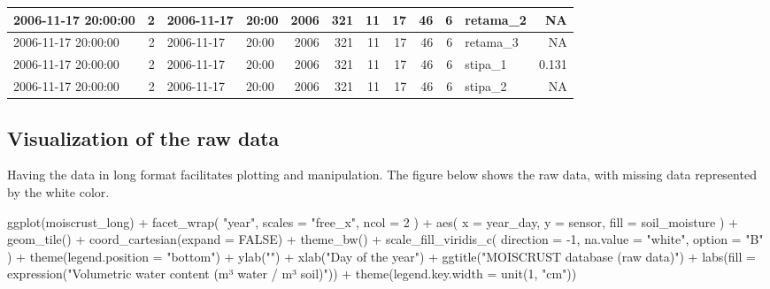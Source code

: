 \documentclass[
  table]{article}
\newenvironment{Shaded}{\begin{snugshade}}{\end{snugshade}}
\newcommand{\AttributeTok}[1]{\textcolor[rgb]{0.77,0.63,0.00}{#1}}
\newcommand{\ConstantTok}[1]{\textcolor[rgb]{0.00,0.00,0.00}{#1}}
\newcommand{\DecValTok}[1]{\textcolor[rgb]{0.00,0.00,0.81}{#1}}
\newcommand{\FunctionTok}[1]{\textcolor[rgb]{0.00,0.00,0.00}{#1}}
\newcommand{\NormalTok}[1]{#1}
\newcommand{\SpecialCharTok}[1]{\textcolor[rgb]{0.00,0.00,0.00}{#1}}
\newcommand{\StringTok}[1]{\textcolor[rgb]{0.31,0.60,0.02}{#1}}
\begin{document}
\begin{table}[H]
{\begin{tabular}[t]{l|r|l|l|r|r|r|r|r|r|l|r}
\hline
2006-11-17 20:00:00 & 2 & 2006-11-17 & 20:00 & 2006 & 321 & 11 & 17 & 46 & 6 & retama\_2 & NA\\
\hline
2006-11-17 20:00:00 & 2 & 2006-11-17 & 20:00 & 2006 & 321 & 11 & 17 & 46 & 6 & retama\_3 & NA\\
\hline
2006-11-17 20:00:00 & 2 & 2006-11-17 & 20:00 & 2006 & 321 & 11 & 17 & 46 & 6 & stipa\_1 & 0.131\\
\hline
2006-11-17 20:00:00 & 2 & 2006-11-17 & 20:00 & 2006 & 321 & 11 & 17 & 46 & 6 & stipa\_2 & NA\\
\hline
\end{tabular}}
\end{table}

\hypertarget{visualization-of-the-raw-data}{%
\subsection{Visualization of the raw
data}\label{visualization-of-the-raw-data}}

Having the data in long format facilitates plotting and manipulation.
The figure below shows the raw data, with missing data represented by
the white color.

\begin{Shaded}
\begin{Highlighting}[]
\FunctionTok{ggplot}\NormalTok{(moiscrust\_long) }\SpecialCharTok{+} 
  \FunctionTok{facet\_wrap}\NormalTok{(}
    \StringTok{"year"}\NormalTok{, }
    \AttributeTok{scales =} \StringTok{"free\_x"}\NormalTok{, }
    \AttributeTok{ncol =} \DecValTok{2}
\NormalTok{    ) }\SpecialCharTok{+}
  \FunctionTok{aes}\NormalTok{(}
    \AttributeTok{x =}\NormalTok{ year\_day, }
    \AttributeTok{y =}\NormalTok{ sensor, }
    \AttributeTok{fill =}\NormalTok{ soil\_moisture}
\NormalTok{    ) }\SpecialCharTok{+} 
  \FunctionTok{geom\_tile}\NormalTok{() }\SpecialCharTok{+} 
  \FunctionTok{coord\_cartesian}\NormalTok{(}\AttributeTok{expand =} \ConstantTok{FALSE}\NormalTok{) }\SpecialCharTok{+}
  \FunctionTok{theme\_bw}\NormalTok{() }\SpecialCharTok{+} 
  \FunctionTok{scale\_fill\_viridis\_c}\NormalTok{(}
    \AttributeTok{direction =} \SpecialCharTok{{-}}\DecValTok{1}\NormalTok{, }
    \AttributeTok{na.value =} \StringTok{"white"}\NormalTok{, }
    \AttributeTok{option =} \StringTok{"B"}
\NormalTok{    ) }\SpecialCharTok{+} 
  \FunctionTok{theme}\NormalTok{(}\AttributeTok{legend.position =} \StringTok{"bottom"}\NormalTok{) }\SpecialCharTok{+} 
  \FunctionTok{ylab}\NormalTok{(}\StringTok{""}\NormalTok{) }\SpecialCharTok{+} 
  \FunctionTok{xlab}\NormalTok{(}\StringTok{"Day of the year"}\NormalTok{) }\SpecialCharTok{+}
  \FunctionTok{ggtitle}\NormalTok{(}\StringTok{"MOISCRUST database (raw data)"}\NormalTok{) }\SpecialCharTok{+}
  \FunctionTok{labs}\NormalTok{(}\AttributeTok{fill =} \FunctionTok{expression}\NormalTok{(}\StringTok{"Volumetric water content (m³ water / m³ soil)"}\NormalTok{)) }\SpecialCharTok{+} 
  \FunctionTok{theme}\NormalTok{(}\AttributeTok{legend.key.width =} \FunctionTok{unit}\NormalTok{(}\DecValTok{1}\NormalTok{, }\StringTok{"cm"}\NormalTok{))}
\end{Highlighting}
\end{Shaded}
\end{document}

